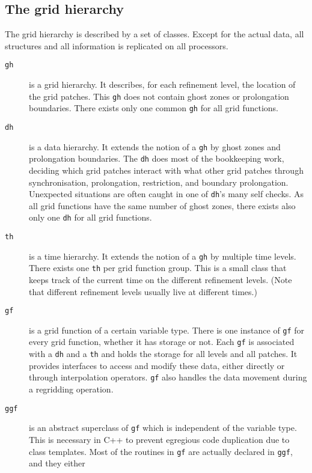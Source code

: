 \documentclass{article}
\begin{document}
\subsection{The grid hierarchy}

   The grid hierarchy is described by a set of classes.  Except for
   the actual data, all structures and all information is replicated
   on all processors.
\begin{description}
\item[\texttt{gh}]
   is a grid hierarchy.  It describes, for each refinement level, the
   location of the grid patches.  This \texttt{gh} does not contain
   ghost zones or prolongation boundaries.  There exists only one
   common \texttt{gh} for all grid functions.
\item[\texttt{dh}]
   is a data hierarchy.  It extends the notion of a \texttt{gh} by
   ghost zones and prolongation boundaries.  The \texttt{dh} does most
   of the bookkeeping work, deciding which grid patches interact with
   what other grid patches through synchronisation, prolongation,
   restriction, and boundary prolongation.  Unexpected situations are
   often caught in one of \texttt{dh}'s many self checks.  As all grid
   functions have the same number of ghost zones, there exists also
   only one \texttt{dh} for all grid functions.
\item[\texttt{th}]
   is a time hierarchy.  It extends the notion of a \texttt{gh} by
   multiple time levels.  There exists one \texttt{th} per grid
   function group.  This is a small class that keeps track of the
   current time on the different refinement levels.  (Note that
   different refinement levels usually live at different times.)
\item[\texttt{gf}]
   is a grid function of a certain variable type.  There is one
   instance of \texttt{gf} for every grid function, whether it has
   storage or not.  Each \texttt{gf} is associated with a \texttt{dh}
   and a \texttt{th} and holds the storage for all levels and all
   patches.  It provides interfaces to access and modify these data,
   either directly or through interpolation operators.  \texttt{gf}
   also handles the data movement during a regridding operation.
\item[\texttt{ggf}]
   is an abstract superclass of \texttt{gf} which is independent of
   the variable type.  This is necessary in C++ to prevent egregious
   code duplication due to class templates.  Most of the routines in
   \texttt{gf} are actually declared in \texttt{ggf}, and they either

\end{description}
\end{document}
